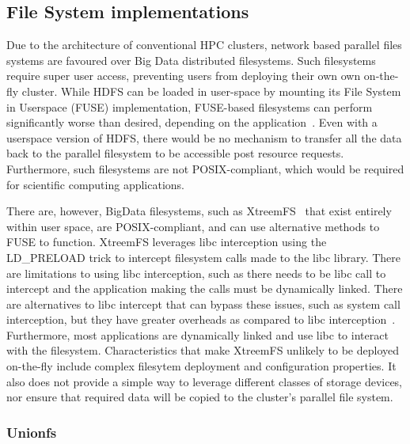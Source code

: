 \subsection{File System implementations}
      Due to the architecture of conventional HPC clusters, network based parallel
      files systems are favoured over Big Data distributed filesystems. Such filesystems
      require super user access, preventing users from deploying their own own on-the-fly cluster.
      While HDFS can be loaded in user-space by mounting its File System in Userspace (FUSE) implementation,
      FUSE-based filesystems can perform significantly worse than desired, depending on the application~\cite{tofuse}.
      Even with a userspace version of HDFS, there would
      be no mechanism to transfer all the data back to the parallel filesystem to be accessible
      post resource requests. Furthermore, such filesystems are not POSIX-compliant, which
      would be required for scientific computing applications.
      
      There are, however, BigData filesystems, such as XtreemFS~\cite{xtreemfs} that
      exist entirely within user space, are POSIX-compliant, and can use alternative
      methods to FUSE to function. XtreemFS leverages libc interception using the LD\_PRELOAD
      trick to intercept filesystem calls made to the libc library. There are
      limitations to using libc interception, such as there needs to be libc call to intercept and the
      application making the calls must be dynamically linked.
      There are alternatives to libc intercept that can bypass these issues, such as
      system call interception, but they have greater overheads as compared to libc interception~\cite{quinson}.
      Furthermore, most applications are dynamically linked and use libc to interact
      with the filesystem. Characteristics that make XtreemFS unlikely to be deployed
      on-the-fly include complex filesytem deployment and configuration properties. It
      also does not provide a simple way to leverage different classes of storage
      devices, nor ensure that required data will be copied to the cluster's parallel file system.
\subsubsection{Unionfs}
